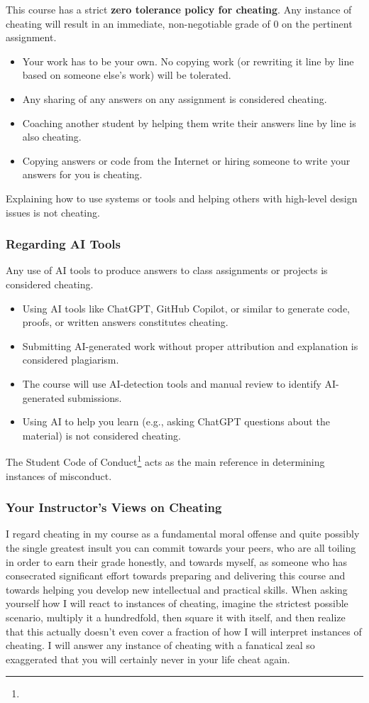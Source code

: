 \documentclass[10pt,a4paper,american]{exam}
\begin{document}
This course has a strict \textbf{zero tolerance policy for cheating}. Any instance of cheating will result in an immediate, non-negotiable grade of 0 on the pertinent assignment.
\begin{itemize}
	\item Your work has to be your own. No copying work (or rewriting it line by line based on someone else's work) will be tolerated.
	\item Any sharing of any answers on any assignment is considered cheating.
	\item Coaching another student by helping them write their answers line by line is also cheating.
	\item Copying answers or code from the Internet or hiring someone to write your answers for you is cheating.
\end{itemize}

Explaining how to use systems or tools and helping others with high-level design issues is not cheating.

\subsubsection{Regarding AI Tools}
Any use of AI tools to produce answers to class assignments or projects is considered cheating.
\begin{itemize}
	\item Using AI tools like ChatGPT, GitHub Copilot, or similar to generate code, proofs, or written answers constitutes cheating.
	\item Submitting AI-generated work without proper attribution and explanation is considered plagiarism.
	\item The course will use AI-detection tools and manual review to identify AI-generated submissions.
	\item Using AI to help you learn (e.g., asking ChatGPT questions about the material) is not considered cheating.
\end{itemize}

The Student Code of Conduct\footnote{\urlcodeofconduct} acts as the main reference in determining instances of misconduct.

\subsubsection{Your Instructor's Views on Cheating}
I regard cheating in my course as a fundamental moral offense and quite possibly the single greatest insult you can commit towards your peers, who are all toiling in order to earn their grade honestly, and towards myself, as someone who has consecrated significant effort towards preparing and delivering this course and towards helping you develop new intellectual and practical skills. When asking yourself how I will react to instances of cheating, imagine the strictest possible scenario, multiply it a hundredfold, then square it with itself, and then realize that this actually doesn't even cover a fraction of how I will interpret instances of cheating. I will answer any instance of cheating with a fanatical zeal so exaggerated that you will certainly never in your life cheat again.
\end{document}
